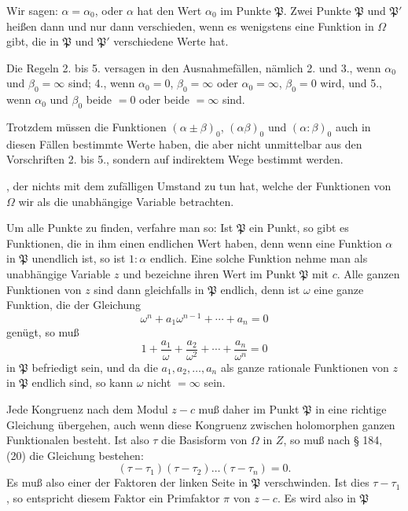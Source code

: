  Wir sagen: $\alpha = \alpha_0$, oder $\alpha$ hat den Wert $\alpha_0$
im Punkte $\mathfrak{P}$. Zwei Punkte $\mathfrak{P}$ und $\mathfrak{P}'$ heißen dann und nur dann
verschieden, wenn es wenigstens eine Funktion in $\Omega$ gibt, die in
$\mathfrak{P}$ und $\mathfrak{P}'$ verschiedene Werte hat.

Die Regeln 2. bis 5. versagen in den Ausnahmefällen, nämlich
2. und 3., wenn $\alpha_0$ und $\beta_0 = \infty$ sind; 4., wenn $\alpha_0 = 0$, $\beta_0 = \infty$
oder $\alpha_0 = \infty$, $\beta_0 = 0$ wird, und 5., wenn $\alpha_0$ und $\beta_0$ beide $= 0$
oder beide $= \infty$ sind.

Trotzdem müssen die Funktionen $(\alpha \pm \beta)_0$, $(\alpha\beta)_0$ und $(\alpha : \beta)_0$
auch in diesen Fällen bestimmte Werte haben, die aber nicht unmittelbar
 aus den Vorschriften 2. bis 5., sondern auf indirektem
Wege bestimmt werden.

, der nichts mit dem zufälligen
Umstand zu tun hat, welche der Funktionen von $\Omega$ wir als die
unabhängige Variable betrachten.

Um alle Punkte zu finden, verfahre man so: Ist $\mathfrak{P}$ ein Punkt,
so gibt es Funktionen, die in ihm einen endlichen Wert haben,
denn wenn eine Funktion $\alpha$ in $\mathfrak{P}$ unendlich ist, so ist $1 : \alpha$ endlich.
Eine solche Funktion nehme man als unabhängige Variable $z$
und bezeichne ihren Wert im Punkt $\mathfrak{P}$ mit $c$. Alle ganzen Funktionen
 von $z$ sind dann gleichfalls in $\mathfrak{P}$ endlich, denn ist $\omega$ eine
ganze Funktion, die der Gleichung
\[
\omega^{n} + a_1\omega^{n-1} + \cdots + a_n = 0
\]
genügt, so muß
\[
1 + \frac{a_1}{\omega} + \frac{a_2}{\omega^2} + \cdots + \frac{a_n}{\omega^n} = 0
\]
in $\mathfrak{P}$ befriedigt sein, und da die $a_1, a_2, \dots, a_n$ als ganze rationale
Funktionen von $z$ in $\mathfrak{P}$ endlich sind, so kann $\omega$ nicht $= \infty$ sein.

Jede Kongruenz nach dem Modul $z - c$ muß daher im
Punkt $\mathfrak{P}$ in eine richtige Gleichung übergehen, auch wenn diese
Kongruenz zwischen holomorphen ganzen Funktionalen besteht.
Ist also $\tau$ die Basisform von $\Omega$ in $Z$, so muß nach § 184, (20) die
Gleichung bestehen:
\[
(\tau - \tau_1)(\tau - \tau_2)\dots(\tau - \tau_n) = 0.
\]
Es muß also einer der Faktoren der linken Seite in $\mathfrak{P}$ verschwinden.
Ist dies $\tau - \tau_1$, so entspricht diesem Faktor ein
Primfaktor $\pi$ von $z - c$. Es wird also in $\mathfrak{P}$

